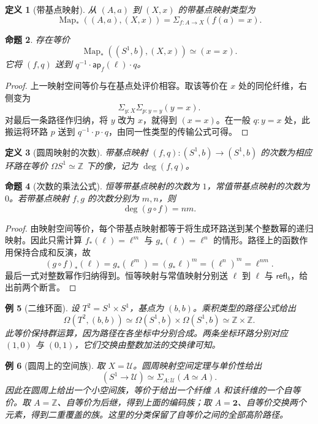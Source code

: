\documentclass[12pt,oneside,openany,fontset=none]{ctexbook}
\theoremstyle{cn}
\newtheorem{definition}{定义}[chapter]
\newtheorem{example}[definition]{例}
\newtheorem{proposition}[definition]{命题}
\numberwithin{equation}{chapter}
\newcommand{\U}{\mathcal U}
\newcommand{\Map}{\operatorname{Map}}
\newcommand{\refl}{\mathsf{refl}}
\newcommand{\ap}{\mathsf{ap}}
\newcommand{\Z}{\mathbb Z}
\begin{document}
\begin{definition}[带基点映射]
从 $(A,a)$ 到 $(X,x)$ 的带基点映射类型为
\[
 \Map_*((A,a),(X,x))
 =\Sigma_{f:A\to X}(f(a)=x).
\]
\end{definition}

\begin{proposition}
存在等价
\[
 \Map_*((S^1,b),(X,x))\simeq(x=x).
\]
它将 $(f,q)$ 送到 $q^{-1}\cdot\ap_f(\ell)\cdot q$。
\end{proposition}
\begin{proof}
上一映射空间等价与在基点处评价相容。取该等价在 $x$ 处的同伦纤维，右侧变为
\[
 \Sigma_{y:X}\Sigma_{p:y=y}(y=x).
\]
对最后一条路径作归纳，将 $y$ 改为 $x$，就得到 $(x=x)$。在一般 $q:y=x$ 处，此搬运将环路 $p$ 送到 $q^{-1}\cdot p\cdot q$，由同一性类型的传输公式可得。
\end{proof}

\begin{definition}[圆周映射的次数]
带基点映射 $(f,q):(S^1,b)\to(S^1,b)$ 的次数为相应环路在等价 $\Omega S^1\simeq\Z$ 下的像，记为 $\deg(f,q)$。
\end{definition}

\begin{proposition}[次数的乘法公式]
恒等带基点映射的次数为 $1$，常值带基点映射的次数为 $0$。若带基点映射 $f,g$ 的次数分别为 $m,n$，则
\[
 \deg(g\circ f)=nm.
\]
\end{proposition}
\begin{proof}
由映射空间等价，每个带基点映射都等于将生成环路送到某个整数幂的递归映射。因此只需计算 $f_*(\ell)=\ell^m$ 与 $g_*(\ell)=\ell^n$ 的情形。路径上的函数作用保持合成和反演，故
\[
 (g\circ f)_*(\ell)
 =g_*(\ell^m)
 =(g_*\ell)^m
 =(\ell^n)^m
 =\ell^{nm}.
\]
最后一式对整数幂作归纳得到。恒等映射与常值映射分别送 $\ell$ 到 $\ell$ 与 $\refl_b$，给出前两个断言。
\end{proof}

\begin{example}[二维环面]
设 $T^2=S^1\times S^1$，基点为 $(b,b)$。乘积类型的路径公式给出
\[
 \Omega(T^2,(b,b))
 \simeq\Omega(S^1,b)\times\Omega(S^1,b)
 \simeq\Z\times\Z.
\]
此等价保持群运算，因为路径在各坐标中分别合成。两条坐标环路分别对应 $(1,0)$ 与 $(0,1)$，它们交换由整数加法的交换律可知。
\end{example}

\begin{example}[圆周上的空间族]
取 $X=\U$。圆周映射空间定理与单价性给出
\[
 (S^1\to\U)\simeq\Sigma_{A:\U}(A\simeq A).
\]
因此在圆周上给出一个小空间族，等价于给出一个纤维 $A$ 和该纤维的一个自等价。取 $A=\Z$、自等价为后继，得到上面的编码族；取 $A=\mathbf2$、自等价交换两个元素，得到二重覆盖的族。这里的分类保留了自等价之间的全部高阶路径。
\end{example}
\end{document}
